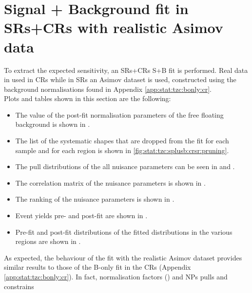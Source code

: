 
\section{Signal + Background fit in SRs+CRs with realistic Asimov data}
\label{sec:stat:tzc:splusb:crsr}
To extract the expected sensitivity, an SRs+CRs S+B fit is performed. 
Real data in used in CRs while in SRs an Asimov dataset is used,
constructed using the background normalisations found in Appendix \ref{app:stat:tzc:bonly:cr}.\\
Plots and tables shown in this section are the following:
\begin{itemize}
\item The value of the post-fit normalisation parameters of the free floating background is shown in .
\item The list of the systematic shapes that are dropped from the fit for each sample and for each region is shown in \cref{fig:stat:tzc:splusb:crsr:pruning}.
\item The pull distributions of the all nuisance parameters can be seen in  and . 
\item The correlation matrix of the nuisance parameters is shown in . 
\item The ranking of the nuisance parameters is shown in . 
\item Event yields pre- and post-fit are shown in . 
\item Pre-fit and post-fit distributions of the fitted distributions in the various regions are shown in .
\end{itemize}
As expected, the behaviour of the fit with the realistic Asimov dataset
provides similar results to those of the B-only fit in the CRs
(Appendix \ref{app:stat:tzc:bonly:cr}). 
In fact, normalisation factors () and NPs
pulls and constrains 
